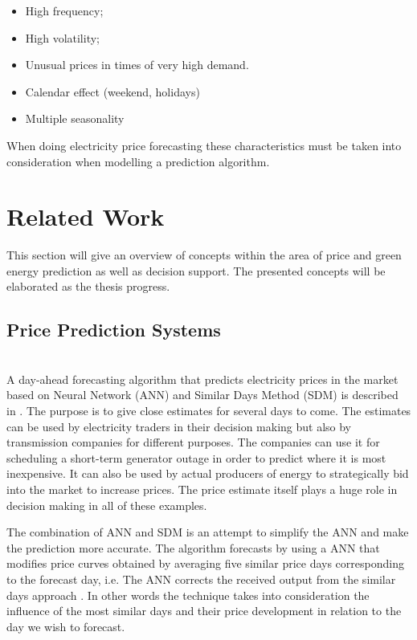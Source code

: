 \documentclass[twoside,11pt,openright]{report}
\begin{document}
\begin{itemize}
\item High frequency;
\item High volatility;
\item Unusual prices in times of very high demand.
\item Calendar effect (weekend, holidays)
\item Multiple seasonality
\end{itemize}
When doing electricity price forecasting these characteristics must be taken into consideration when modelling a prediction algorithm. 
\section{Related Work}
This section will give an overview of concepts within the area of price and green energy prediction as well as decision support. The presented concepts will be elaborated as the thesis progress.

\subsection{Price Prediction Systems}

\\[0.5cm]
A day-ahead forecasting algorithm that predicts electricity prices in the market based on Neural Network (ANN) and Similar Days Method (SDM) is described in \cite{pjmForecast}. The purpose is to give close estimates for several days to come. The estimates can be used by electricity traders in their decision making but also by transmission companies for different purposes. The companies can use it for scheduling a short-term generator outage in order to predict where it is most inexpensive. It can also be used by actual producers of energy to strategically bid into the market to increase prices. The price estimate itself plays a huge role in decision making in all of these examples.

The combination of ANN and SDM is an attempt to simplify the ANN and make the prediction more accurate. The algorithm forecasts by using a ANN that modifies price curves obtained by averaging five similar price days corresponding to the forecast day, i.e. The ANN corrects the received output from the similar days approach \cite{pjmForecast}. In other words the technique takes into consideration the influence of the most similar days and their price development in relation to the day we wish to forecast.
\end{document}
